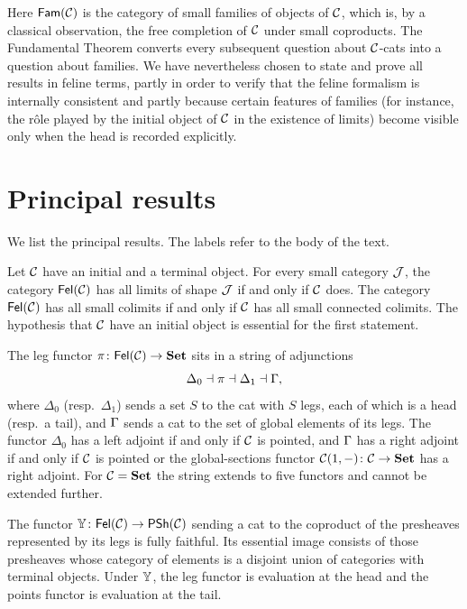 Here $\mathsf{Fam}(\mathcal{C})$ is the category of small families of objects of $\mathcal{C}$, which
is, by a classical observation, the free completion of $\mathcal{C}$ under small
coproducts. The Fundamental Theorem converts every subsequent question about
$\mathcal{C}$-cats into a question about families. We have nevertheless chosen to
state and prove all results in feline terms, partly in order to verify that
the feline formalism is internally consistent and partly because certain
features of families (for instance, the r\^ole played by the initial object
of $\mathcal{C}$ in the existence of limits) become visible only when the head is
recorded explicitly.

\section{Principal results}

We list the principal results. The labels refer to the body of the text.

\begin{mainthm}\label{mthm:limits}
Let $\mathcal{C}$ have an initial and a terminal object. For every small category
$\mathcal{J}$, the category $\mathsf{Fel}(\mathcal{C})$ has all limits of shape $\mathcal{J}$ if and only if
$\mathcal{C}$ does. The category $\mathsf{Fel}(\mathcal{C})$ has all small colimits if and only if
$\mathcal{C}$ has all small connected colimits. The hypothesis that $\mathcal{C}$ have an
initial object is essential for the first statement.
\end{mainthm}

\begin{mainthm}\label{mthm:string}
The leg functor $\pi\colon\mathsf{Fel}(\mathcal{C})\to\mathbf{Set}$ sits in a string of adjunctions
\[
\Delta_0\dashv \pi \dashv \Delta_1 \dashv \Gamma,
\]
where $\Delta_0$ (resp.\ $\Delta_1$) sends a set $S$ to the cat with $S$
legs, each of which is a head (resp.\ a tail), and $\Gamma$ sends a cat to
the set of global elements of its legs. The functor $\Delta_0$ has a left
adjoint if and only if $\mathcal{C}$ is pointed, and $\Gamma$ has a right adjoint
if and only if $\mathcal{C}$ is pointed or the global-sections functor
$\mathcal{C}(1,-)\colon\mathcal{C}\to\mathbf{Set}$ has a right adjoint. For $\mathcal{C}=\mathbf{Set}$ the string
extends to five functors and cannot be extended further.
\end{mainthm}

\begin{mainthm}\label{mthm:yoneda}
The functor $\mathbb{Y}\colon\mathsf{Fel}(\mathcal{C})\to\mathsf{PSh}(\mathcal{C})$ sending a cat to the coproduct
of the presheaves represented by its legs is fully faithful. Its essential
image consists of those presheaves whose category of elements is a disjoint
union of categories with terminal objects. Under $\mathbb{Y}$, the leg functor is
evaluation at the head and the points functor is evaluation at the tail.
\end{mainthm}


